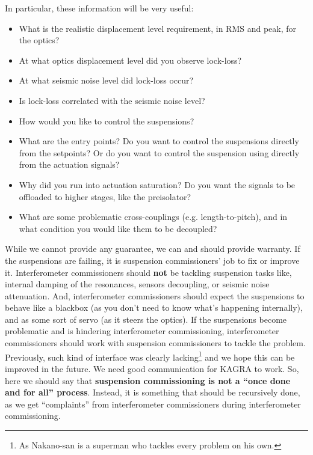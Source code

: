 In particular, these information will be very useful:
\begin{itemize}
	\item What is the realistic displacement level requirement, in RMS and peak, for the optics?
	\item At what optics displacement level did you observe lock-loss?
	\item At what seismic noise level did lock-loss occur?
	\item Is lock-loss correlated with the seismic noise level?
	\item How would you like to control the suspensions?
	\item What are the entry points? Do you want to control the suspensions directly from the setpoints? Or do you want to control the suspension using directly from the actuation signals?
	\item Why did you run into actuation saturation? Do you want the signals to be offloaded to higher stages, like the preisolator?
	\item What are some problematic cross-couplings (e.g. length-to-pitch), and in what condition you would like them to be decoupled?
\end{itemize}

While we cannot provide any guarantee, we can and should provide warranty.
If the suspensions are failing, it is suspension commissioners' job to fix or improve it.
Interferometer commissioners should \textbf{not} be tackling suspension tasks like, internal damping of the resonances, sensors decoupling, or seismic noise attenuation.
And, interferometer commissioners should expect the suspensions to behave like a blackbox (as you don't need to know what's happening internally), and as some sort of servo (as it steers the optics).
If the suspensions become problematic and is hindering interferometer commissioning, interferometer commissioners should work with suspension commissioners to tackle the problem.
Previously, such kind of interface was clearly lacking\footnote{As Nakano-san is a superman who tackles every problem on his own.} and we hope this can be improved in the future.
We need good communication for KAGRA to work.
So, here we should say that \textbf{suspension commissioning is not a ``once done and for all'' process}.
Instead, it is something that should be recursively done, as we get ``complaints'' from interferometer commissioners during interferometer commissioning.






